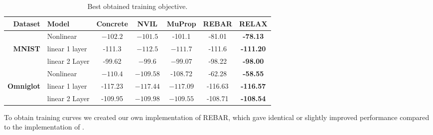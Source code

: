 \documentclass{article}
\newcommand{\E}{\mathbb{E}}
\newcommand{\PT}{\frac{\partial}{\partial \theta}}
\newcommand{\PP}[1]{\frac{\partial}{\partial #1}}
\begin{document}
\begin{table}[h]
\centering
\begin{tabular}{r l | c c c c c} 
Dataset & Model & Concrete & NVIL & MuProp  & REBAR & RELAX\\\midrule 
               & Nonlinear & $-102.2$ & $-101.5$ & -101.1  &  -81.01 &  \textbf{-78.13} \\
\textbf{MNIST} & linear 1 layer  &-111.3 & $-112.5$ & $-111.7$  & -111.6 & \textbf{-111.20} \\ 
               & linear 2 Layer  &-99.62 & $-99.6$ & $-99.07$   & -98.22 & \textbf{-98.00} \\
\midrule
               & Nonlinear  & $-110.4$  & $-109.58$ & -108.72  & -62.28 & \textbf{-58.55} \\
\textbf{Omniglot} & linear 1 layer &-117.23 & $-117.44$ & $-117.09$   & -116.63 & \textbf{-116.57} \\ 
                  & linear 2 Layer &-109.95 & $-109.98$ & $-109.55$  & -108.71 & \textbf{-108.54}
\end{tabular}
\caption{Best obtained training objective.}
\label{tab:vae tr}
\end{table}





To obtain training curves we created our own implementation of REBAR, which gave identical or slightly improved performance compared to the implementation of \citet{tucker2017rebar}.
\end{document}
